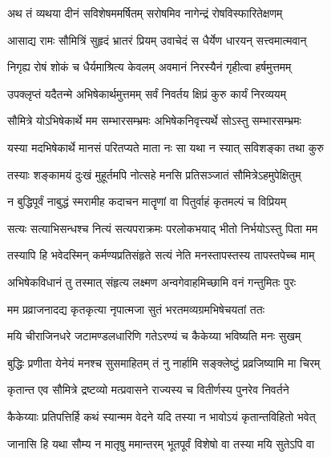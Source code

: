 
\twolineshloka
{अथ तं व्यथया दीनं सविशेषममर्षितम्}
{सरोषमिव नागेन्द्रं रोषविस्फारितेक्षणम्} %

\twolineshloka
{आसाद्य रामः सौमित्रिं सुहृदं भ्रातरं प्रियम्}
{उवाचेदं स धैर्येण धारयन् सत्त्वमात्मवान्} %

\twolineshloka
{निगृह्य रोषं शोकं च धैर्यमाश्रित्य केवलम्}
{अवमानं निरस्यैनं गृहीत्वा हर्षमुत्तमम्} %

\twolineshloka
{उपक्लृप्तं यदैतन्मे अभिषेकार्थमुत्तमम्}
{सर्वं निवर्तय क्षिप्रं कुरु कार्यं निरव्ययम्} %

\twolineshloka
{सौमित्रे योऽभिषेकार्थे मम सम्भारसम्भ्रमः}
{अभिषेकनिवृत्त्यर्थे सोऽस्तु सम्भारसम्भ्रमः} %

\twolineshloka
{यस्या मदभिषेकार्थे मानसं परितप्यते}
{माता नः सा यथा न स्यात् सविशङ्का तथा कुरु} %

\twolineshloka
{तस्याः शङ्कामयं दुःखं मुहूर्तमपि नोत्सहे}
{मनसि प्रतिसञ्जातं सौमित्रेऽहमुपेक्षितुम्} %

\twolineshloka
{न बुद्धिपूर्वं नाबुद्धं स्मरामीह कदाचन}
{मातॄणां वा पितुर्वाहं कृतमल्पं च विप्रियम्} %

\twolineshloka
{सत्यः सत्याभिसन्धश्च नित्यं सत्यपराक्रमः}
{परलोकभयाद् भीतो निर्भयोऽस्तु पिता मम} %

\twolineshloka
{तस्यापि हि भवेदस्मिन् कर्मण्यप्रतिसंहृते}
{सत्यं नेति मनस्तापस्तस्य तापस्तपेच्च माम्} %

\twolineshloka
{अभिषेकविधानं तु तस्मात् संहृत्य लक्ष्मण}
{अन्वगेवाहमिच्छामि वनं गन्तुमितः पुरः} %

\twolineshloka
{मम प्रव्राजनादद्य कृतकृत्या नृपात्मजा}
{सुतं भरतमव्यग्रमभिषेचयतां ततः} %

\twolineshloka
{मयि चीराजिनधरे जटामण्डलधारिणि}
{गतेऽरण्यं च कैकेय्या भविष्यति मनः सुखम्} %

\twolineshloka
{बुद्धिः प्रणीता येनेयं मनश्च सुसमाहितम्}
{तं नु नार्हामि सङ्क्लेष्टुं प्रव्रजिष्यामि मा चिरम्} %

\twolineshloka
{कृतान्त एव सौमित्रे द्रष्टव्यो मत्प्रवासने}
{राज्यस्य च वितीर्णस्य पुनरेव निवर्तने} %

\twolineshloka
{कैकेय्याः प्रतिपत्तिर्हि कथं स्यान्मम वेदने}
{यदि तस्या न भावोऽयं कृतान्तविहितो भवेत्} %

\twolineshloka
{जानासि हि यथा सौम्य न मातृषु ममान्तरम्}
{भूतपूर्वं विशेषो वा तस्या मयि सुतेऽपि वा} %

